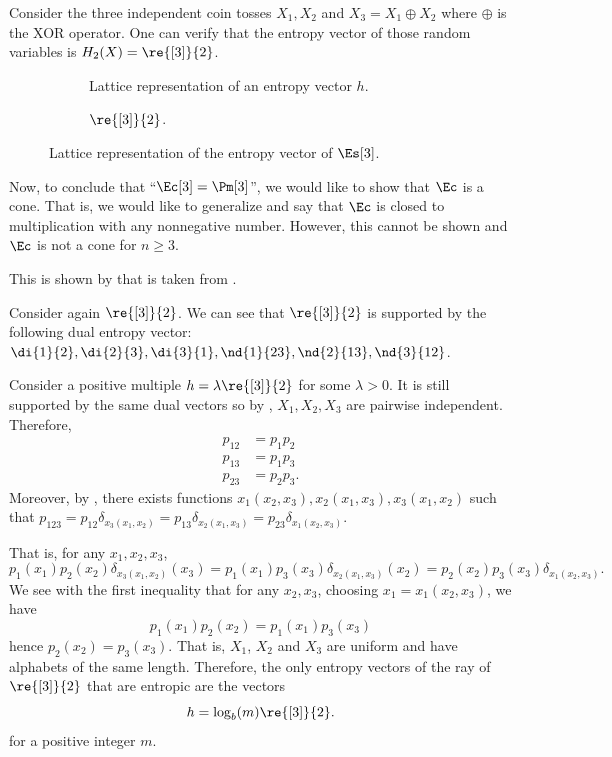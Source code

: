 \documentclass[11pt,twoside,a4paper,openright]{uclouvain-thesis}
\begin{document}
\begin{myexem}
  \label{exem:xor}
  Consider the three independent coin tosses $X_1, X_2$ and $X_3 = X_1 \oplus X_2$ where $\oplus$ is the XOR operator.
  One can verify that the entropy vector of those random variables is $H_2(X) = \re{[3]}{2}$.
\end{myexem}

\begin{figure}[!ht]
  \centering
  \begin{subfigure}{0.48\textwidth}
    \centering
    \caption{Lattice representation of an entropy vector $h$.}
    \label{fig:latex}
  \end{subfigure}
  \begin{subfigure}{0.45\textwidth}
    \centering
    \caption{$\re{[3]}{2}$.}
    \label{fig:xor}
  \end{subfigure}
  \caption{Lattice representation of the entropy vector of $\Es[3]$.}
\end{figure}

Now, to conclude that ``$\Ec[3] = \Pm[3]$'', we would like to show that $\Ec$ is a cone.
That is, we would like to generalize  and say that $\Ec$ is closed to multiplication with any nonnegative number.
However, this cannot be shown and $\Ec$ is not a cone for $n \geq 3$.

This is shown by  that is taken from \cite{zhang1997non}.

\begin{myexem}
  \label{exem:notcone}
  Consider again $\re{[3]}{2}$.
  We can see that $\re{[3]}{2}$ is supported by the following dual entropy vector:
  $\di{1}{2}, \di{2}{3}, \di{3}{1}, \nd{1}{23}, \nd{2}{13}, \nd{3}{12}$.

  Consider a positive multiple $h = \lambda \re{[3]}{2}$ for some $\lambda > 0$.
  It is still supported by the same dual vectors so by , $X_1, X_2, X_3$ are pairwise independent.
  Therefore,
  \begin{align*}
    p_{12} & = p_1 p_2\\
    p_{13} & = p_1 p_3\\
    p_{23} & = p_2 p_3.
  \end{align*}
  Moreover, by ,
  there exists functions $x_1(x_2, x_3), x_2(x_1, x_3), x_3(x_1, x_2)$ such that
  $p_{123} = p_{12}\delta_{x_3(x_1, x_2)} = p_{13}\delta_{x_2(x_1, x_3)} = p_{23}\delta_{x_1(x_2, x_3)}$.

  That is, for any $x_1, x_2, x_3$,
  \[ p_1(x_1)p_2(x_2)\delta_{x_3(x_1, x_2)}(x_3) = p_1(x_1)p_3(x_3)\delta_{x_2(x_1, x_3)}(x_2) = p_2(x_2)p_3(x_3)\delta_{x_1(x_2, x_3)}. \]
  We see with the first inequality that for any $x_2,x_3$, choosing $x_1 = x_1(x_2, x_3)$, we have
  \[ p_1(x_1)p_2(x_2) = p_1(x_1)p_3(x_3) \]
  hence $p_2(x_2) = p_3(x_3)$.
  That is, $X_1$, $X_2$ and $X_3$ are uniform and have alphabets of the same length.
  Therefore, the only entropy vectors of the ray of $\re{[3]}{2}$ that are entropic are the vectors
  \[ h = \log_b(m)\re{[3]}{2}. \]
  for a positive integer $m$.
\end{myexem}
\end{document}
